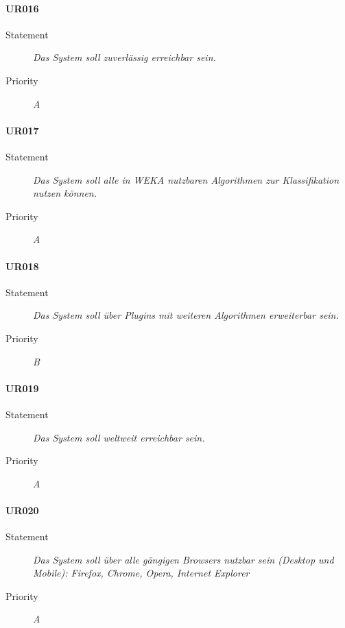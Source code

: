 \paragraph{UR016}
\begin{description}
\item[Statement] \textit{Das System soll zuverlässig erreichbar sein.}
\item[Priority] \textit{A}
\end{description}

\paragraph{UR017}
\begin{description}
  \item[Statement]
    \textit{Das System soll alle in WEKA nutzbaren Algorithmen zur Klassifikation nutzen können.}
  \item[Priority]
    \textit{A}
\end{description}

\paragraph{UR018}
\begin{description}
\item[Statement] \textit{Das System soll über \gls{Plugins} mit weiteren Algorithmen erweiterbar sein.}
\item[Priority] \textit{B}
\end{description}

\paragraph{UR019}
\begin{description}
\item[Statement] \textit{Das System soll weltweit erreichbar sein.}
\item[Priority] \textit{A}
\end{description}

\paragraph{UR020}
\begin{description}
  \item[Statement]
    \textit{Das System soll über alle gängigen \glspl{Browser} nutzbar sein (Desktop und Mobile): Firefox, Chrome, Opera, Internet Explorer} %
  \item[Priority]
    \textit{A}
\end{description}

